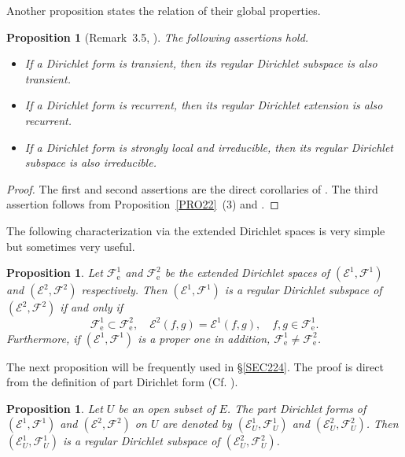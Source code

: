 \documentclass[a4paper]{amsart}
\newtheorem{proposition}[theorem]{Proposition}
\theoremstyle{definition}
\theoremstyle{remark}
\numberwithin{equation}{section}
\begin{document}
Another proposition states the relation of their global properties. 

\begin{proposition}[Remark~3.5, \cite{LY15-3}]\label{PRO23}
The following assertions hold.
\begin{itemize}
\item[(1)] If a Dirichlet form is transient, then its regular Dirichlet subspace is also  transient.
\item[(2)] If a Dirichlet form is recurrent, then its regular Dirichlet extension is also recurrent.
\item[(3)] If a Dirichlet form is strongly local and irreducible, then its regular Dirichlet subspace is also irreducible.
\end{itemize}
\end{proposition}
\begin{proof}
The first and second assertions are the direct corollaries of \cite[Theorem~1.6.4]{FOT11}. The third assertion follows from Proposition~\ref{PRO22}~(3) and \cite[Theorem~4.6.4]{FOT11}.
\end{proof}

The following characterization via the extended Dirichlet spaces is very simple but sometimes very useful.

\begin{proposition}
Let ${{\mathcal{F}}}^1_\mathrm{e}$ and ${{\mathcal{F}}}^2_\mathrm{e}$ be the extended Dirichlet spaces of $({{\mathcal{E}}}^1,{{\mathcal{F}}}^1)$ and $({{\mathcal{E}}}^2,{{\mathcal{F}}}^2)$ respectively. Then $({{\mathcal{E}}}^1,{{\mathcal{F}}}^1)$ is a regular Dirichlet subspace of $({{\mathcal{E}}}^2,{{\mathcal{F}}}^2)$ if and only if
\[
	{{\mathcal{F}}}^1_\mathrm{e}\subset {{\mathcal{F}}}^2_\mathrm{e},\quad {{\mathcal{E}}}^2(f,g)={{\mathcal{E}}}^1(f,g),\quad f,g\in {{\mathcal{F}}}^1_\mathrm{e}.
\]
Furthermore, if $({{\mathcal{E}}}^1,{{\mathcal{F}}}^1)$ is a proper one in addition, ${{\mathcal{F}}}^1_\mathrm{e}\neq {{\mathcal{F}}}^2_\mathrm{e}$.
\end{proposition}

The next proposition will be frequently used in \S\ref{SEC224}. The proof is direct from the definition of part Dirichlet form  (Cf. \cite[\S4.4]{FOT11}).

\begin{proposition}\label{PRO25}
Let $U$ be an open subset of $E$. The part Dirichlet forms of $({{\mathcal{E}}}^1,{{\mathcal{F}}}^1)$ and $({{\mathcal{E}}}^2, {{\mathcal{F}}}^2)$ on $U$ are denoted by $({{\mathcal{E}}}_U^1,{{\mathcal{F}}}_U^1)$ and $({{\mathcal{E}}}_U^2, {{\mathcal{F}}}_U^2)$. Then $({{\mathcal{E}}}^1_U,{{\mathcal{F}}}^1_U)$ is a regular Dirichlet subspace of $({{\mathcal{E}}}^2_U,{{\mathcal{F}}}^2_U)$.
\end{proposition}
\end{document}
